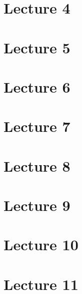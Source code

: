 \documentclass[11pt]{article}
\begin{document}
\part{Lecture 4}

    

\part{Lecture 5}

    

\part{Lecture 6}

    

\part{Lecture 7}

    

\part{Lecture 8}

    

\part{Lecture 9}

    

    \part{Lecture 10}

    

\part{Lecture 11}

    
\end{document}
